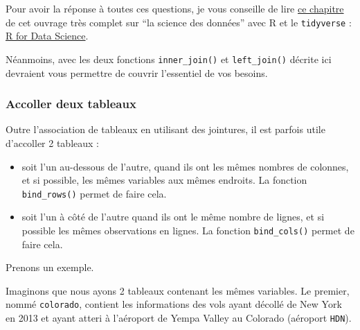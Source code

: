 \documentclass[a4paperpaper,]{article}
\newenvironment{Shaded}{\begin{snugshade}}{\end{snugshade}}
\newcommand{\KeywordTok}[1]{\textcolor[rgb]{0.12,0.11,0.11}{\textbf{#1}}}
\newcommand{\NormalTok}[1]{\textcolor[rgb]{0.12,0.11,0.11}{#1}}
\newcommand{\OperatorTok}[1]{\textcolor[rgb]{0.12,0.11,0.11}{#1}}
\newcommand{\StringTok}[1]{\textcolor[rgb]{0.75,0.01,0.01}{#1}}
\providecommand{\tightlist}{%
  \setlength{\itemsep}{0pt}\setlength{\parskip}{0pt}}
\theoremstyle{definition}
\theoremstyle{definition}
\theoremstyle{definition}
\theoremstyle{remark}
\begin{document}
Pour avoir la réponse à toutes ces questions, je vous conseille de lire
\href{http://r4ds.had.co.nz/relational-data.html}{ce chapitre} de cet
ouvrage très complet sur ``la science des données'' avec R et le
\texttt{tidyverse} : \href{http://r4ds.had.co.nz}{R for Data Science}.

Néanmoins, avec les deux fonctions \texttt{inner\_join()} et
\texttt{left\_join()} décrite ici devraient vous permettre de couvrir
l'essentiel de vos besoins.

\hypertarget{accoller-deux-tableaux}{%
\subsubsection{Accoller deux tableaux}\label{accoller-deux-tableaux}}

Outre l'association de tableaux en utilisant des jointures, il est
parfois utile d'accoller 2 tableaux :

\begin{itemize}
\tightlist
\item
  soit l'un au-dessous de l'autre, quand ils ont les mêmes nombres de
  colonnes, et si possible, les mêmes variables aux mêmes endroits. La
  fonction \texttt{bind\_rows()} permet de faire cela.
\item
  soit l'un à côté de l'autre quand ils ont le même nombre de lignes, et
  si possible les mêmes observations en lignes. La fonction
  \texttt{bind\_cols()} permet de faire cela.
\end{itemize}

Prenons un exemple.

Imaginons que nous ayons 2 tableaux contenant les mêmes variables. Le
premier, nommé \texttt{colorado}, contient les informations des vols
ayant décollé de New York en 2013 et ayant atteri à l'aéroport de Yempa
Valley au Colorado (aéroport \texttt{HDN}).

\begin{Shaded}
\end{Shaded}
\end{document}
